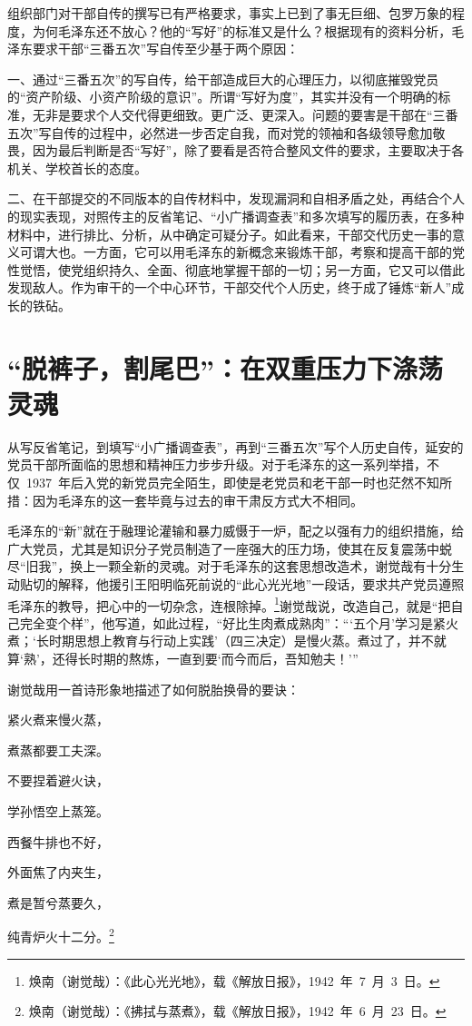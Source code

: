 组织部门对干部自传的撰写已有严格要求，事实上已到了事无巨细、包罗万象的程度，为何毛泽东还不放心？他的“写好”的标准又是什么？根据现有的资料分析，毛泽东要求干部“三番五次”写自传至少基于两个原因：

一、通过“三番五次”的写自传，给干部造成巨大的心理压力，以彻底摧毁党员的“资产阶级、小资产阶级的意识”。所谓“写好为度”，其实并没有一个明确的标准，无非是要求个人交代得更细致。更广泛、更深入。问题的要害是干部在“三番五次”写自传的过程中，必然进一步否定自我，而对党的领袖和各级领导愈加敬畏，因为最后判断是否“写好”，除了要看是否符合整风文件的要求，主要取决于各机关、学校首长的态度。

二、在干部提交的不同版本的自传材料中，发现漏洞和自相矛盾之处，再结合个人的现实表现，对照传主的反省笔记、“小广播调查表”和多次填写的履历表，在多种材料中，进行排比、分析，从中确定可疑分子。如此看来，干部交代历史一事的意义可谓大也。一方面，它可以用毛泽东的新概念来锻炼干部，考察和提高干部的党性觉悟，使党组织持久、全面、彻底地掌握干部的一切；另一方面，它又可以借此发现敌人。作为审干的一个中心环节，干部交代个人历史，终于成了锤炼“新人”成长的铁砧。

\section{“脱裤子，割尾巴”：在双重压力下涤荡灵魂}

从写反省笔记，到填写“小广播调查表”，再到“三番五次”写个人历史自传，延安的党员干部所面临的思想和精神压力步步升级。对于毛泽东的这一系列举措，不仅~1937~年后入党的新党员完全陌生，即使是老党员和老干部一时也茫然不知所措：因为毛泽东的这一套毕竟与过去的审干肃反方式大不相同。

毛泽东的“新”就在于融理论灌输和暴力威慑于一炉，配之以强有力的组织措施，给广大党员，尤其是知识分子党员制造了一座强大的压力场，使其在反复震荡中蜕尽“旧我”，换上一颗全新的灵魂。对于毛泽东的这套思想改造术，谢觉哉有十分生动贴切的解释，他援引王阳明临死前说的“此心光光地”一段话，要求共产党员遵照毛泽东的教导，把心中的一切杂念，连根除掉。\footnote{焕南（谢觉哉）：《此心光光地》，载《解放日报》，1942~年~7~月~3~日。}谢觉哉说，改造自己，就是“把自己完全变个样”，他写道，如此过程，“好比生肉煮成熟肉”：“‘五个月’学习是紧火煮；‘长时期思想上教育与行动上实践’（四三决定）是慢火蒸。煮过了，并不就算‘熟’，还得长时期的熬炼，一直到要‘而今而后，吾知勉夫！’”

谢觉哉用一首诗形象地描述了如何脱胎换骨的要诀：

\begin{quoting}
紧火煮来慢火蒸，

煮蒸都要工夫深。

不要捏着避火诀，

学孙悟空上蒸笼。

西餐牛排也不好，

外面焦了内夹生，

煮是暂兮蒸要久，

纯青炉火十二分。\footnote{焕南（谢觉哉）：《拂拭与蒸煮》，载《解放日报》，1942~年~6~月~23~日。}
\end{quoting}

